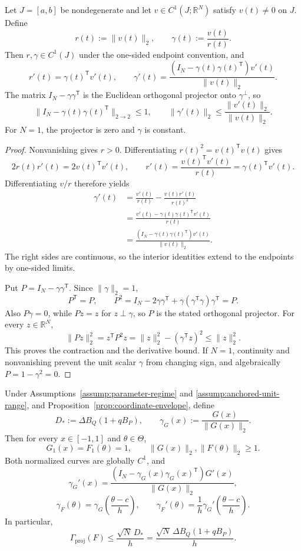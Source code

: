 \begin{lemma}
\label{lem:normalized-curve}
Let $J=[a,b]$ be nondegenerate and let
$v\in C^1(J;\mathbb R^N)$ satisfy $v(t)\neq0$ on $J$.  Define
\[
r(t):=\|v(t)\|_2,
\qquad
\gamma(t):=\frac{v(t)}{r(t)}.
\]
Then $r,\gamma\in C^1(J)$ under the one-sided endpoint convention, and
\[
r'(t)=\gamma(t)^{\mathsf T}v'(t),
\qquad
\gamma'(t)
=\frac{(I_N-\gamma(t)\gamma(t)^{\mathsf T})v'(t)}{\|v(t)\|_2}.
\]
The matrix $I_N-\gamma\gamma^{\mathsf T}$ is the Euclidean orthogonal
projector onto $\gamma^\perp$, so
\[
\|I_N-\gamma(t)\gamma(t)^{\mathsf T}\|_{2\to2}\leq1,
\qquad
\|\gamma'(t)\|_2\leq\frac{\|v'(t)\|_2}{\|v(t)\|_2}.
\]
For $N=1$, the projector is zero and $\gamma$ is constant.
\end{lemma}

\begin{proof}
Nonvanishing gives $r>0$.  Differentiating
$r(t)^2=v(t)^{\mathsf T}v(t)$ gives
\[
2r(t)r'(t)=2v(t)^{\mathsf T}v'(t),
\qquad
r'(t)=\frac{v(t)^{\mathsf T}v'(t)}{r(t)}
=\gamma(t)^{\mathsf T}v'(t).
\]
Differentiating $v/r$ therefore yields
\[
\begin{aligned}
\gamma'(t)
&=\frac{v'(t)}{r(t)}-\frac{v(t)r'(t)}{r(t)^2}\\
&=\frac{v'(t)-\gamma(t)\gamma(t)^{\mathsf T}v'(t)}{r(t)}\\
&=\frac{(I_N-\gamma(t)\gamma(t)^{\mathsf T})v'(t)}{\|v(t)\|_2}.
\end{aligned}
\]
The right sides are continuous, so the interior identities extend to the
endpoints by one-sided limits.

Put $P=I_N-\gamma\gamma^{\mathsf T}$.  Since $\|\gamma\|_2=1$,
\[
P^{\mathsf T}=P,
\qquad
P^2=I_N-2\gamma\gamma^{\mathsf T}
 +\gamma(\gamma^{\mathsf T}\gamma)\gamma^{\mathsf T}=P.
\]
Also $P\gamma=0$, while $Pz=z$ for $z\perp\gamma$, so $P$ is the stated
orthogonal projector.  For every $z\in\mathbb R^N$,
\[
\|Pz\|_2^2=z^{\mathsf T}P^2z
=\|z\|_2^2-(\gamma^{\mathsf T}z)^2
\leq\|z\|_2^2.
\]
This proves the contraction and the derivative bound.  If $N=1$, continuity
and nonvanishing prevent the unit scalar $\gamma$ from changing sign, and
algebraically $P=1-\gamma^2=0$.
\end{proof}

\begin{proposition}
\label{prop:projective-speed}
Under Assumptions~\ref{assump:parameter-regime} and
\ref{assump:anchored-unit-range}, and
Proposition~\ref{prop:coordinate-envelope}, define
\[
D_*:=\Delta B_Q(1+qB_P),
\qquad
\gamma_G(x):=\frac{G(x)}{\|G(x)\|_2}.
\]
Then for every $x\in[-1,1]$ and $\theta\in\Theta$,
\[
G_1(x)=F_1(\theta)=1,
\qquad
\|G(x)\|_2,\|F(\theta)\|_2\geq1.
\]
Both normalized curves are globally $C^1$, and
\[
\gamma_G'(x)
=\frac{(I_N-\gamma_G(x)\gamma_G(x)^{\mathsf T})G'(x)}{\|G(x)\|_2},
\]
\[
\gamma_F(\theta)=\gamma_G\!\left(\frac{\theta-c}{h}\right),
\qquad
\gamma_F'(\theta)=\frac1h\gamma_G'\!\left(\frac{\theta-c}{h}\right).
\]
In particular,
\[
\Gamma_{\mathrm{proj}}(F)
\leq\frac{\sqrt N\,D_*}{h}
=\frac{\sqrt N\,\Delta B_Q(1+qB_P)}{h}.
\]
\end{proposition}

